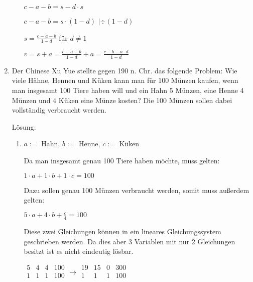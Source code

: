 \documentclass[main.tex]{subfiles}
\begin{document}
\begin{enumerate}
\begin{enumerate}
		            \(
		            c - a - b = s - d \cdot s
		            \)

		            \(
		            c - a - b = s \cdot (1 - d)
		            \)
		            \(|\)\(
		            \div (1-d)
		            \)

		            \(
		            s = \frac{c - a - b}{1-d}
		            \) für \(
		            d \neq 1
		            \)

		            \(
		            v = s + a = \frac{c - a - b}{1-d} + a = \frac{c - b - a \cdot d}{1 - d}
		            \)
	      \end{enumerate}
	\item Der Chinese Xu Yue stellte gegen 190 n. Chr. das folgende Problem:
	      Wie viele Hähne, Hennen und Küken kann man für 100 Münzen kaufen,
	      wenn man insgesamt 100 Tiere haben will und ein Hahn 5 Münzen,
	      eine Henne 4 Münzen und 4 Küken eine Münze kosten?
	      Die 100 Münzen sollen dabei vollständig verbraucht werden.

	      Lösung:
	      \begin{enumerate}
		      \item
		            \(
		            a :=
		            \) Hahn,
		            \(
		            b :=
		            \) Henne,
		            \(
		            c :=
		            \) Küken

		            Da man insgesamt genau 100 Tiere haben möchte, muss gelten:

		            \(
		            1 \cdot a + 1 \cdot b + 1 \cdot c = 100
		            \)

		            Dazu sollen genau 100 Münzen verbraucht werden, somit muss außerdem gelten:

		            \(
		            5 \cdot a + 4 \cdot b + \frac{c}{4} = 100
		            \)

		            Diese zwei Gleichungen können in ein lineares Gleichungssystem geschrieben werden.
		            Da dies aber 3 Variablen mit nur 2 Gleichungen besitzt ist es nicht eindeutig lösbar.

		            \(
		            \begin{array}{ccc|c}
			            5 & 4 & 4 & 100 \\
			            1 & 1 & 1 & 100 \\
		            \end{array}
		            \rightarrow
		            \begin{array}{ccc|c}
			            19 & 15 & 0 & 300 \\
			            1  & 1  & 1 & 100 \\
		            \end{array}
		            \)


\end{enumerate}
\end{enumerate}
\end{document}
